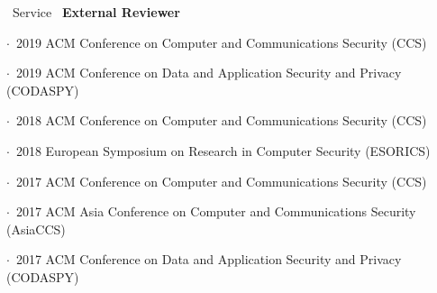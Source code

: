 \documentclass{resume} %
\begin{document}
\begin{rSection}{\faGenderless~Service}
	\textbullet~{\bf External Reviewer} \\
        \strut\hspace{1cm}$\cdot$~2019 ACM Conference on Computer and Communications Security (CCS)\\
        \strut\hspace{1cm}$\cdot$~2019 ACM Conference on Data and Application Security and Privacy (CODASPY)\\
		\strut\hspace{1cm}$\cdot$~2018 ACM Conference on Computer and Communications Security (CCS)\\
		\strut\hspace{1cm}$\cdot$~2018 European Symposium on Research in Computer Security (ESORICS)\\
		\strut\hspace{1cm}$\cdot$~2017 ACM Conference on Computer and Communications Security (CCS)\\
		\strut\hspace{1cm}$\cdot$~2017 ACM Asia Conference on Computer and Communications Security (AsiaCCS) \\
		\strut\hspace{1cm}$\cdot$~2017 ACM Conference on Data and Application Security and Privacy (CODASPY)

	\vspace{3mm}
\end{rSection}
\end{document}
